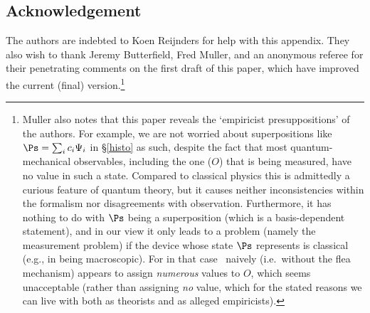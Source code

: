 \documentclass[12pt]{article}
\newcommand{\mmp}{measurement problem}
\begin{document}
  \subsection*{Acknowledgement}
  The authors are indebted to Koen Reijnders for help with this appendix.
  They also wish to thank Jeremy Butterfield, Fred Muller,  and an anonymous referee for their penetrating comments on the first draft of this paper, which have  improved the current (final) version.\footnote{Muller also notes that this paper reveals the `empiricist presuppositions' of the authors. For example, we are not worried about superpositions like $\Ps=\sum_i c_i \Psi_i$ in \S\ref{histo} as such, despite the fact that most quantum-mechanical observables, including the one ($O$) that is being measured, have no value in such a state. Compared to classical physics this is admittedly a curious feature of quantum theory, but it causes neither  inconsistencies within the formalism nor disagreements with observation. Furthermore, it has nothing to do with $\Ps$ being a superposition (which is a basis-dependent statement), and in our view it only leads to a problem (namely the \mmp) if the device whose state $\Ps$ represents is classical (e.g., in being macroscopic). For in that case \qm\ naively (i.e.\ without the flea mechanism) appears to assign
  \emph{numerous} values to $O$, which seems unacceptable (rather than assigning \emph{no} value, which for the stated reasons we can live with both as theorists and as alleged empiricists). }
\newpage
\end{document}
